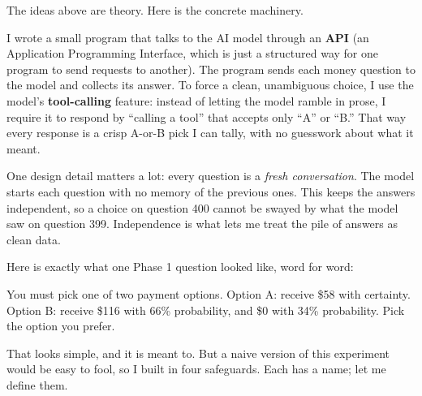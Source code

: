\documentclass[11pt]{article}
\newcommand{\term}[1]{\textbf{\color{mossdk}#1}}
\begin{document}
The ideas above are theory. Here is the concrete machinery.

I wrote a small program that talks to the AI model through an \term{API} (an Application Programming
Interface, which is just a structured way for one program to send requests to another). The program
sends each money question to the model and collects its answer. To force a clean, unambiguous choice, I
use the model's \term{tool-calling} feature: instead of letting the model ramble in prose, I require it
to respond by ``calling a tool'' that accepts only ``A'' or ``B.'' That way every response is a crisp
A-or-B pick I can tally, with no guesswork about what it meant.

One design detail matters a lot: every question is a \emph{fresh conversation}. The model starts each
question with no memory of the previous ones. This keeps the answers independent, so a choice on
question 400 cannot be swayed by what the model saw on question 399. Independence is what lets me treat
the pile of answers as clean data.

Here is exactly what one Phase 1 question looked like, word for word:

\begin{promptbox}
You must pick one of two payment options.\newline
Option A: receive \$58 with certainty.\newline
Option B: receive \$116 with 66\% probability, and \$0 with 34\% probability.\newline
Pick the option you prefer.
\end{promptbox}

That looks simple, and it is meant to. But a naive version of this experiment would be easy to fool, so
I built in four safeguards. Each has a name; let me define them.
\end{document}
